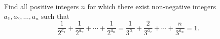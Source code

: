 Find all positive integers $n$ for which there exist non-negative integers $a_1, a_2, \ldots, a_n$ such that\[
\frac{1}{2^{a_1}} + \frac{1}{2^{a_2}} + \cdots + \frac{1}{2^{a_n}} = 
\frac{1}{3^{a_1}} + \frac{2}{3^{a_2}} + \cdots + \frac{n}{3^{a_n}} = 1.
\]
